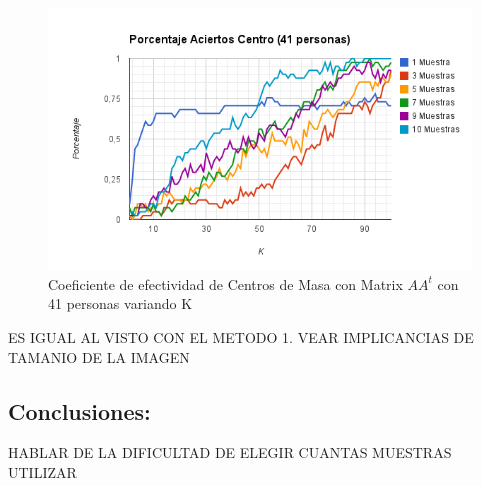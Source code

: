 \begin{figure}[H]
\includegraphics[width=1\textwidth]{img/imagef15.png}
     \caption{Coeficiente de efectividad de Centros de Masa  con Matrix $AA^t$ con 41 personas variando K}
\end{figure}


ES IGUAL AL VISTO CON EL METODO 1. VEAR IMPLICANCIAS DE TAMANIO DE LA IMAGEN

\subsection{Conclusiones:}

HABLAR DE LA DIFICULTAD DE ELEGIR CUANTAS MUESTRAS UTILIZAR
